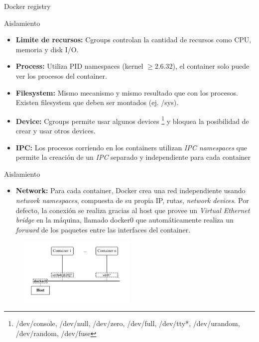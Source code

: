 \documentclass[compress]{beamer}
\begin{document}
\begin{frame}{Docker registry}

\begin{figure}[H]
  \centering
    \label{fig:dynamic}
\end{figure}	
\end{frame}


\begin{frame}{Aislamiento}
	\begin{itemize}
		\item \textbf{Limite de recursos:}  Cgroups controlan la cantidad de recursos como CPU, memoria y disk I/O.
		\item \textbf{Process:} Utiliza PID namespaces (kernel \(\geq 2.6.32\)), el container solo puede ver los procesos del container.
		\item \textbf{Filesystem:} Mismo mecanismo y mismo resultado que con los procesos. Existen filesystem que deben ser montados (ej. /sys).
		\item \textbf{Device:} Cgroups permite usar algunos devices \footnote{/dev/console, /dev/null, /dev/zero, /dev/full, /dev/tty*, /dev/urandom, /dev/random, /dev/fuse} y bloquea la posibilidad de crear y usar otros devices.
		\item \textbf{IPC:} Los procesos corriendo en los containers utilizan \textit{IPC namespaces} que permite la creación de un \textit{IPC} separado y independiente para cada container 
	\end{itemize}
\end{frame}

\begin{frame}{Aislamiento}
	\begin{itemize}
	
		\item \textbf{Network:}
		Para cada container, Docker crea una red independiente usando \textit{network namespaces}, compuesta de su propia IP, rutas, \textit{network devices}.
		Por defecto, la conexión se realiza gracias al host que provee un \textit{Virtual Ethernet bridge} en la máquina, llamado docker0 que automáticamente realiza un \textit{forward} de los paquetes entre las interfaces del container.
	\end{itemize}
	
	\begin{figure}[H]
  \centering
  \includegraphics[width=0.5\textwidth]{images/network.png}
    \label{fig:dynamic}
\end{figure}	
\end{frame}
\end{document}
